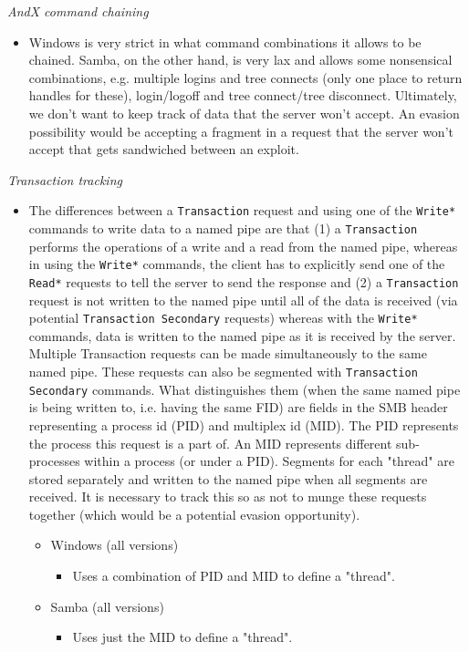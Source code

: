 \documentclass[english]{report}
\begin{document}
\textit{AndX command chaining}
\begin{itemize}

\item[] Windows is very strict in what command combinations it allows to be
chained. Samba, on the other hand, is very lax and allows some nonsensical
combinations, e.g. multiple logins and tree connects (only one place to return
handles for these), login/logoff and tree connect/tree disconnect.  Ultimately,
we don't want to keep track of data that the server won't accept. An evasion
possibility would be accepting a fragment in a request that the server won't
accept that gets sandwiched between an exploit.

\end{itemize}

\textit{Transaction tracking}
\begin{itemize}

\item[] The differences between a \texttt{Transaction} request and using one of
the \texttt{Write*} commands to write data to a named pipe are that (1) a
\texttt{Transaction} performs the operations of a write and a read from the
named pipe, whereas in using the \texttt{Write*} commands, the client has to
explicitly send one of the \texttt{Read*} requests to tell the server to send
the response and (2) a \texttt{Transaction} request is not written to the named
pipe until all of the data is received (via potential \texttt{Transaction
Secondary} requests) whereas with the \texttt{Write*} commands, data is written
to the named pipe as it is received by the server. Multiple Transaction
requests can be made simultaneously to the same named pipe. These requests can
also be segmented with \texttt{Transaction Secondary} commands. What
distinguishes them (when the same named pipe is being written to, i.e. having
the same FID) are fields in the SMB header representing a process id (PID) and
multiplex id (MID).  The PID represents the process this request is a part of.
An MID represents different sub-processes within a process (or under a PID).
Segments for each "thread" are stored separately and written to the named pipe
when all segments are received. It is necessary to track this so as not to
munge these requests together (which would be a potential evasion opportunity).

\begin{itemize}
\item[] Windows (all versions)
\begin{itemize}
\item[] Uses a combination of PID and MID to define a "thread".
\end{itemize}
\item[] Samba (all versions)
\begin{itemize}
\item[] Uses just the MID to define a "thread".
\end{itemize}
\end{itemize}
\end{itemize}
\end{document}
